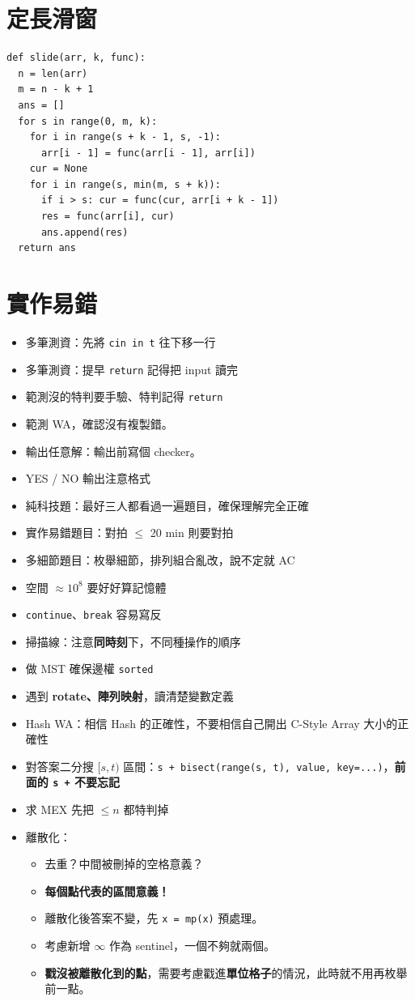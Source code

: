 \documentclass[10pt, a4paper, twocolumn]{article}
\begin{document}
\section{定長滑窗}

\begin{verbatim}
def slide(arr, k, func):
  n = len(arr)
  m = n - k + 1
  ans = []
  for s in range(0, m, k):
    for i in range(s + k - 1, s, -1):
      arr[i - 1] = func(arr[i - 1], arr[i])
    cur = None
    for i in range(s, min(m, s + k)):
      if i > s: cur = func(cur, arr[i + k - 1])
      res = func(arr[i], cur)
      ans.append(res)
  return ans
\end{verbatim}

\section{實作易錯}

\begin{itemize}[itemsep=0.1em, leftmargin=*]
  \item 多筆測資：先將 \texttt{cin in t} 往下移一行
  \item 多筆測資：提早 \texttt{return} 記得把 input 讀完
  \item 範測沒的特判要手驗、特判記得 \texttt{return}
  \item 範測 WA，確認沒有複製錯。
  \item 輸出任意解：輸出前寫個 checker。
  \item YES / NO 輸出注意格式
  \item 純科技題：最好三人都看過一遍題目，確保理解完全正確
  \item 實作易錯題目：對拍 $\le$ 20 min 則要對拍
  \item 多細節題目：枚舉細節，排列組合亂改，說不定就 AC
  \item 空間 $\approx 10 ^ 8$ 要好好算記憶體
  \item \texttt{continue}、\texttt{break} 容易寫反
  \item 掃描線：注意\textbf{同時刻}下，不同種操作的順序
  \item 做 MST 確保邊權 \texttt{sorted}
  \item 遇到 \textbf{rotate、陣列映射}，讀清楚變數定義
  \item Hash WA：相信 Hash 的正確性，不要相信自己開出 C-Style Array 大小的正確性
  \item 對答案二分搜 $[s, t)$ 區間：\texttt{s + bisect(range(s, t), value, key=...)}，\textbf{前面的 \texttt{s +} 不要忘記}
  \item 求 MEX 先把 $\le n$ 都特判掉
  \item 離散化：
  \begin{itemize}[itemsep=0.1em, leftmargin=*]
    \item 去重？中間被刪掉的空格意義？
    \item \textbf{每個點代表的區間意義！}
    \item 離散化後答案不變，先 \texttt{x = mp(x)} 預處理。
    \item 考慮新增 $\infty$ 作為 sentinel，一個不夠就兩個。
    \item \textbf{戳沒被離散化到的點}，需要考慮戳進\textbf{單位格子}的情況，此時就不用再枚舉前一點。
  \end{itemize}
\end{itemize}
\end{document}
